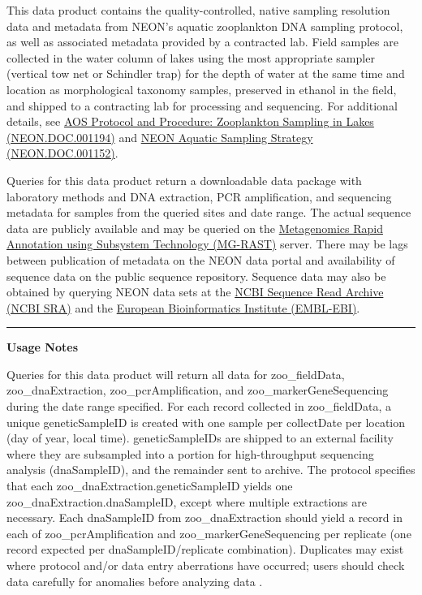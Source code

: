 \documentclass[]{article}
\begin{document}
This data product contains the quality-controlled, native sampling
resolution data and metadata from NEON's aquatic zooplankton DNA
sampling protocol, as well as associated metadata provided by a
contracted lab. Field samples are collected in the water column of lakes
using the most appropriate sampler (vertical tow net or Schindler trap)
for the depth of water at the same time and location as morphological
taxonomy samples, preserved in ethanol in the field, and shipped to a
contracting lab for processing and sequencing. For additional details,
see
\href{http://data.neonscience.org/api/v0/documents/NEON.DOC.001194vG}{AOS
Protocol and Procedure: Zooplankton Sampling in Lakes (NEON.DOC.001194)}
and
\href{http://data.neonscience.org/api/v0/documents/NEON.DOC.001152vA}{NEON
Aquatic Sampling Strategy (NEON.DOC.001152)}.

Queries for this data product return a downloadable data package with
laboratory methods and DNA extraction, PCR amplification, and sequencing
metadata for samples from the queried sites and date range. The actual
sequence data are publicly available and may be queried on the
\href{http://metagenomics.anl.gov/}{Metagenomics Rapid Annotation using
Subsystem Technology (MG-RAST)} server. There may be lags between
publication of metadata on the NEON data portal and availability of
sequence data on the public sequence repository. Sequence data may also
be obtained by querying NEON data sets at the
\href{https://www.ncbi.nlm.nih.gov/sra}{NCBI Sequence Read Archive (NCBI
SRA)} and the \href{https://www.ebi.ac.uk/}{European Bioinformatics
Institute (EMBL-EBI)}.

\begin{center}\rule{0.5\linewidth}{\linethickness}\end{center}

\textbf{Usage Notes}

Queries for this data product will return all data for zoo\_fieldData,
zoo\_dnaExtraction, zoo\_pcrAmplification, and zoo\_markerGeneSequencing
during the date range specified. For each record collected in
zoo\_fieldData, a unique geneticSampleID is created with one sample per
collectDate per location (day of year, local time). geneticSampleIDs are
shipped to an external facility where they are subsampled into a portion
for high-throughput sequencing analysis (dnaSampleID), and the remainder
sent to archive. The protocol specifies that each
zoo\_dnaExtraction.geneticSampleID yields one
zoo\_dnaExtraction.dnaSampleID, except where multiple extractions are
necessary. Each dnaSampleID from zoo\_dnaExtraction should yield a
record in each of zoo\_pcrAmplification and zoo\_markerGeneSequencing
per replicate (one record expected per dnaSampleID/replicate
combination). Duplicates may exist where protocol and/or data entry
aberrations have occurred; users should check data carefully for
anomalies before analyzing data \newpage
.
\end{document}

